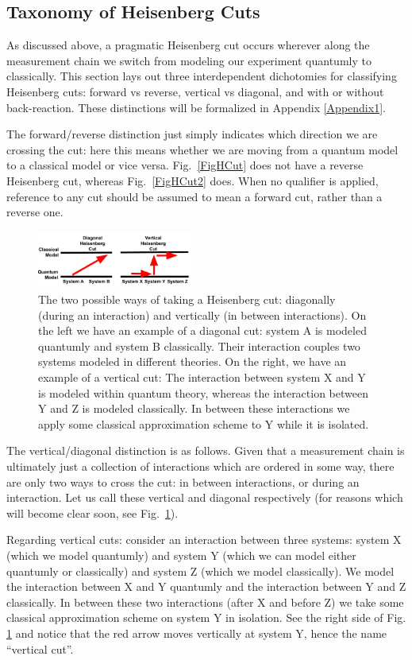 \documentclass[prd,twocolumn,superscriptaddress,floatfix,amsmath,amssymb,amsfonts,nofootinbib]{revtex4-2}
\begin{document}
\subsection{Taxonomy of Heisenberg Cuts}
As discussed above, a pragmatic Heisenberg cut occurs wherever along the measurement chain we switch from modeling our experiment quantumly to classically. This section lays out three interdependent dichotomies for classifying Heisenberg cuts: forward vs reverse, vertical vs diagonal, and with or without back-reaction. These distinctions will be formalized in Appendix \ref{Appendix1}.

The forward/reverse distinction just simply indicates which direction we are crossing the cut: here this means whether we are moving from a quantum model to a classical model or vice versa. Fig.~\ref{FigHCut} does not have a reverse Heisenberg cut, whereas Fig.~\ref{FigHCut2} does. When no qualifier is applied, reference to any cut should be assumed to mean a forward cut, rather than a reverse one.

\begin{figure}
\includegraphics[width=0.45\textwidth]{Figures/DiagVsVert.pdf}
\caption{The two possible ways of taking a Heisenberg cut: diagonally (during an interaction) and vertically (in between interactions). On the left we have an example of a diagonal cut: system A is modeled quantumly and system B classically. Their interaction couples two systems modeled in different theories. On the right, we have an example of a vertical cut: The interaction between system X and Y is modeled within quantum theory, whereas the interaction between Y and Z is modeled classically. In between these interactions we apply some classical approximation scheme to Y while it is isolated.}\label{FigHCut3}
\end{figure}

The vertical/diagonal distinction is as follows. Given that a measurement chain is ultimately just a collection of interactions which are ordered in some way, there are only two ways to cross the cut: in between interactions, or during an interaction. Let us call these vertical and diagonal respectively (for reasons which will become clear soon, see Fig.~\ref{FigHCut3}). 

Regarding vertical cuts: consider an interaction between three systems: system X (which we model quantumly) and system Y (which we can model either quantumly or classically) and system Z (which we model classically). We model the interaction between X and Y quantumly and the interaction between Y and Z classically. In between these two interactions (after X and before Z) we take some classical approximation scheme on system Y in isolation. See the right side of Fig. \ref{FigHCut3} and notice that the red arrow moves vertically at system Y, hence the name ``vertical cut''.
\end{document}

